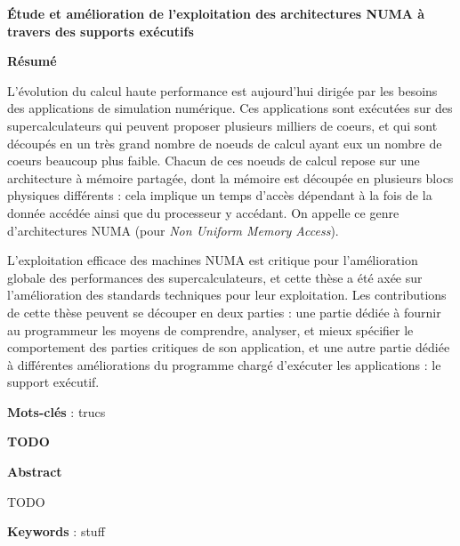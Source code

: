 \MakeUGthesePDG

\clearpage
\ifodd\value{page}\hbox{}\newpage\fi

\begin{center}\textbf{\large Étude et amélioration de l'exploitation des architectures NUMA à travers des supports exécutifs}

\quad

\textbf{Résumé}
\end{center}

L'évolution du calcul haute performance est aujourd'hui dirigée par les besoins des applications de simulation numérique.
Ces applications sont exécutées sur des supercalculateurs qui peuvent proposer plusieurs milliers de coeurs, et qui sont découpés en un très grand nombre de noeuds de calcul ayant eux un nombre de coeurs beaucoup plus faible.
Chacun de ces noeuds de calcul repose sur une architecture à mémoire partagée, dont la mémoire est découpée en plusieurs blocs physiques différents : cela implique un temps d'accès dépendant à la fois de la donnée accédée ainsi que du processeur y accédant.
On appelle ce genre d'architectures NUMA (pour \emph{Non Uniform Memory Access}).

L'exploitation efficace des machines NUMA est critique pour l'amélioration globale des performances des supercalculateurs, et cette thèse a été axée sur l'amélioration des standards techniques pour leur exploitation.
Les contributions de cette thèse peuvent se découper en deux parties : une partie dédiée à fournir au programmeur les moyens de comprendre, analyser, et mieux spécifier le comportement des parties critiques de son application, et une autre partie dédiée à différentes améliorations du programme chargé d'exécuter les applications : le support exécutif.



\quad

\textbf{Mots-clés} : trucs

\begin{center}\textbf{\large TODO }

\quad

\textbf{Abstract}
\end{center}

TODO

\quad

\textbf{Keywords} : stuff




\cleardoublepage
\dominitoc
\makeatletter
\renewcommand{\tableofcontents}[1][\contentsname]{%
  \chapter*{#1}
}
\makeatother
\tableofcontents
